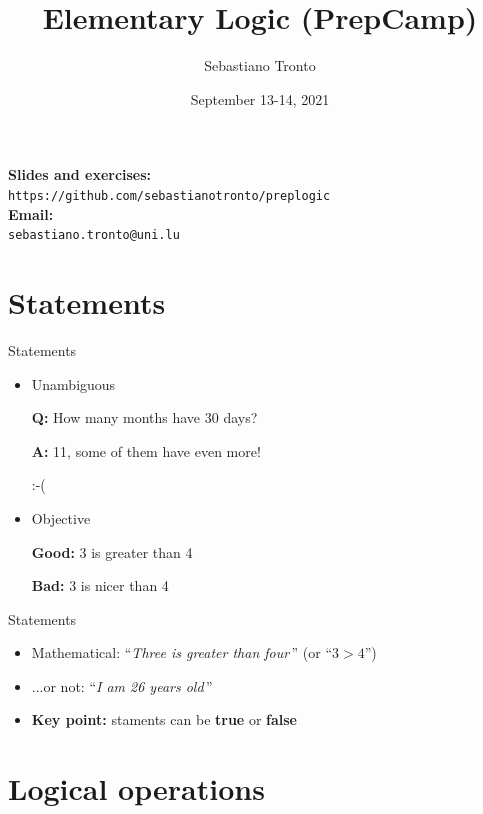 \documentclass[11pt]{beamer}
\author{Sebastiano Tronto}
\title{Elementary Logic (PrepCamp)}
\institute{uni.lu}
\date{September 13-14, 2021}
\makeatletter
\theoremstyle{definition}
\newcommand{\refgithub}{
    \textbf{Slides and exercises:} \\
    \hspace{20pt}\texttt{https://github.com/sebastianotronto/preplogic} \\
    \textbf{Email:} \\
    \hspace{20pt}\texttt{sebastiano.tronto@uni.lu}
}
\makeatother
\begin{document}
\begin{frame}
\titlepage
\end{frame}

\begin{frame}
    \tableofcontents
    \refgithub
\end{frame}


\section{Statements}
\begin{frame}{Statements}
\begin{itemize}
    \pause
 \item Unambiguous
   \pause
\begin{example}
\textbf{Q:} How many months have 30 days?
\pause

\textbf{A:} 11, some of them have even more!
\pause

:-(
\end{example}
\pause
 \item Objective
   \pause
\begin{example}
\textbf{Good:} 3 is greater than 4

\textbf{Bad:} 3 is nicer than 4
\end{example}
\end{itemize}
\end{frame}

\begin{frame}{Statements}
  \begin{itemize}
 \item Mathematical: ``\emph{Three is greater than four}\,''
                    (or ``$3 > 4$'')
 \item ...or not: ``\emph{I am 26 years old}\,''
 \item \textbf{Key point:} staments can be \textbf{true} or
                     \textbf{false}
\end{itemize}
\end{frame}



\section{Logical operations}
\end{document}
